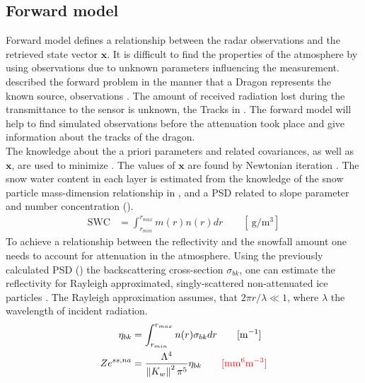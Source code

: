 \subsection{Forward model}\label{sec:forward_model}

Forward model defines a relationship between the radar observations and the retrieved state vector $\mathbf{x}$. It is difficult to find the properties of the atmosphere by using observations due to unknown parameters influencing the measurement. \\
\cite{stephens_remote_1994} described the forward problem in the manner that a Dragon represents the known source, observations . The amount of received radiation lost during the transmittance to the sensor is unknown, the Tracks in . The forward model will help to find simulated observations before the attenuation took place and give information about the tracks of the dragon.  
\\
The knowledge about the a priori parameters and related covariances, as well as $\mathbf{x}$, are used to minimize . The values of $\mathbf{x}$ are found by Newtonian iteration \cite[Eq. 5]{wood_estimating_2014}.
\newline
The snow water content in each layer is estimated from the knowledge of the snow particle mass-dimension relationship in , and a PSD related to slope parameter and number concentration (). %
\begin{align}
	\text{SWC} & = \int_{r_{min}}^{r_{max}} m(r) n(r) dr \qquad [\SI{}{\gram\per\cubic\metre}] \label{eq:SWC}
\end{align}
To achieve a relationship between the reflectivity and the snowfall amount one needs to account for attenuation in the atmosphere. Using the previously calculated PSD () the backscattering cross-section $\sigma_{bk}$, one can estimate the reflectivity for Rayleigh approximated, singly-scattered non-attenuated ice particles \citep{lecuyer_estimation-based_2002,kulie_utilizing_2009,wood_microphysical_2015}. The Rayleigh approximation assumes, that $2\pi r/\lambda \ll 1$, where $\lambda$ the wavelength of incident radiation.
\begin{align}
	\eta_{bk} & = \int_{r_{min}}^{r_{max}} n(r) \sigma_{bk} dr \qquad [\SI{}{\per\metre}] \nonumber \\
	Ze^{ss,na} & = \frac{\Lambda^4}{\left\| K_w \right\|^2 \pi^5} \eta_{bk} \qquad \textcolor{red}{[\SI{}{\mm^6\metre^{-3}}]} \label{eq:singleZ}
\end{align}
